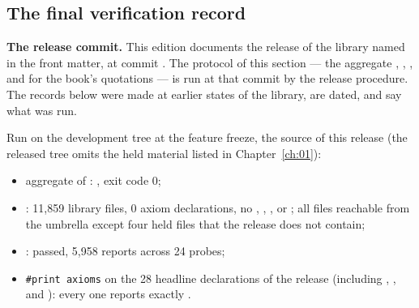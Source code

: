 \subsection{The final verification record}\label{ch15:sec:record}

\textbf{The release commit.} This edition documents the release of the library named in the front matter, at commit
\texttt{\bookcommit}. The protocol of this section --- the aggregate , ,
, and  for the book's quotations --- is run at that commit by the
release procedure. The records below were made at earlier states of the library, are dated, and say what was run.

\begin{status}[title={The release build of v1.0 (3 November 2026; Lean v4.30.0)}]
Run on the development tree at the feature freeze, the source of this release (the released tree omits the held
material listed in Chapter~\ref{ch:01}):
\begin{itemize}
\item aggregate  of : , exit code 0;
\item {}: 11{,}859 library files, 0 axiom declarations, no , ,
  ,  or ; all files reachable from the umbrella except four held
  files that the release does not contain;
\item {}: passed, 5{,}958 reports across 24 probes;
\item \texttt{\#print axioms} on the 28 headline declarations of the release (including
  , ,  and
  ): every one reports exactly
  .
\end{itemize}
\end{status}

